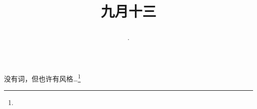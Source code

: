 \title{\date[d=15,m=10,y=2024][year:cn-y,年,month:cn,day:cn,日,·,weekday]·九月十三 }
没有词，但也许有风格…\footnote{ }

